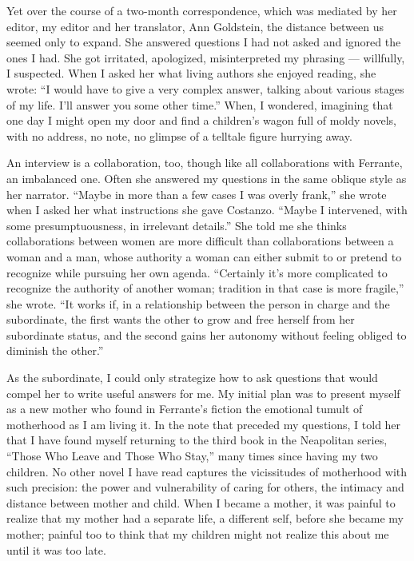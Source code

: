 Yet over the course of a two-month correspondence, which was mediated by
her editor, my editor and her translator, Ann Goldstein, the distance
between us seemed only to expand. She answered questions I had not asked
and ignored the ones I had. She got irritated, apologized,
misinterpreted my phrasing --- willfully, I suspected. When I asked her
what living authors she enjoyed reading, she wrote: ``I would have to
give a very complex answer, talking about various stages of my life.
I'll answer you some other time.'' When, I wondered, imagining that one
day I might open my door and find a children's wagon full of moldy
novels, with no address, no note, no glimpse of a telltale figure
hurrying away.

An interview is a collaboration, too, though like all collaborations
with Ferrante, an imbalanced one. Often she answered my questions in the
same oblique style as her narrator. ``Maybe in more than a few cases I
was overly frank,'' she wrote when I asked her what instructions she
gave Costanzo. ``Maybe I intervened, with some presumptuousness, in
irrelevant details.'' She told me she thinks collaborations between
women are more difficult than collaborations between a woman and a man,
whose authority a woman can either submit to or pretend to recognize
while pursuing her own agenda. ``Certainly it's more complicated to
recognize the authority of another woman; tradition in that case is more
fragile,'' she wrote. ``It works if, in a relationship between the
person in charge and the subordinate, the first wants the other to grow
and free herself from her subordinate status, and the second gains her
autonomy without feeling obliged to diminish the other.''

As the subordinate, I could only strategize how to ask questions that
would compel her to write useful answers for me. My initial plan was to
present myself as a new mother who found in Ferrante's fiction the
emotional tumult of motherhood as I am living it. In the note that
preceded my questions, I told her that I have found myself returning to
the third book in the Neapolitan series, ``Those Who Leave and Those Who
Stay,'' many times since having my two children. No other novel I have
read captures the vicissitudes of motherhood with such precision: the
power and vulnerability of caring for others, the intimacy and distance
between mother and child. When I became a mother, it was painful to
realize that my mother had a separate life, a different self, before she
became my mother; painful too to think that my children might not
realize this about me until it was too late.

